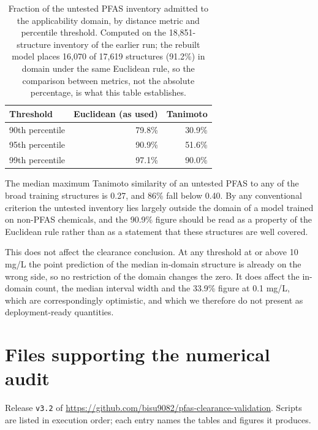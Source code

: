 \documentclass[11pt]{article}
\begin{document}
\begin{table}[h]
\centering
\caption{Fraction of the untested PFAS inventory admitted to the applicability
domain, by distance metric and percentile threshold. Computed on the
18{,}851-structure inventory of the earlier run; the rebuilt model places
16{,}070 of 17{,}619 structures (91.2\%) in domain under the same Euclidean rule,
so the comparison between metrics, not the absolute percentage, is what this
table establishes.}
\small
\begin{tabular}{lrr}
\toprule
Threshold & Euclidean (as used) & Tanimoto \\
\midrule
90th percentile & 79.8\% & 30.9\% \\
95th percentile & 90.9\% & 51.6\% \\
99th percentile & 97.1\% & 90.0\% \\
\bottomrule
\end{tabular}
\end{table}

The median maximum Tanimoto similarity of an untested PFAS to any of the broad
training structures is 0.27, and 86\% fall below 0.40. By any conventional
criterion the untested inventory lies largely outside the domain of a model
trained on non-PFAS chemicals, and the 90.9\% figure should be read as a
property of the Euclidean rule rather than as a statement that these structures
are well covered.

This does not affect the clearance conclusion. At any threshold at or above 10
mg/L the point prediction of the median in-domain structure is already on the
wrong side, so no restriction of the domain changes the zero. It does affect the
in-domain count, the median interval width and the 33.9\% figure at 0.1 mg/L,
which are correspondingly optimistic, and which we therefore do not present as
deployment-ready quantities.

\section{Files supporting the numerical audit}

Release \texttt{v3.2} of \url{https://github.com/bisu9082/pfas-clearance-validation}.
Scripts are listed in execution order; each entry names the tables and figures it
produces.
\end{document}
